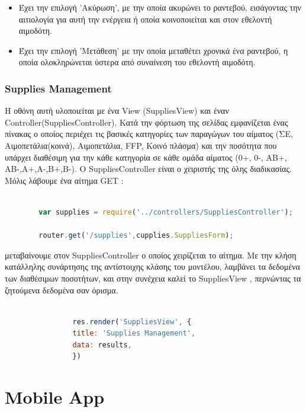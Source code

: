 		\begin{itemize}
		\item Έχει την επιλογή 'Ακύρωση', με την οποία ακυρώνει το ραντεβού, εισάγοντας την αιτιολογία για αυτή την ενέργεια ή οποία κοινοποιείται και στον εθελοντή αιμοδότη.
		
		\item Έχει την επιλογή 'Μετάθεση' με την οποία μεταθέτει χρονικά ένα ραντεβού, η οποία ολοκληρώνεται ύστερα από συναίνεση του εθελοντή αιμοδότη.		
		\end{itemize}

		

		\subsubsection{Supplies Management}
		
	Η οθόνη αυτή υλοποιείται με ένα View (SuppliesView) και έναν Controller(SuppliesController). Κατά την φόρτωση της σελίδας εμφανίζεται ένας πίνακας ο οποίος περιέχει τις βασικές κατηγορίες των παραγώγων του αίματος (ΣΕ, Αιμοπετάλια(κοινά), Αιμοπετάλια, FFP, Κοινό πλάσμα) και την ποσότητα που υπάρχει διαθέσιμη για την κάθε κατηγορία σε κάθε ομάδα αίματος (0+, 0-, ΑΒ+, ΑΒ-,Α+,Α-,Β+,Β-). O SuppliesController είναι ο χειριστής της όλης διαδικασίας. Μόλις λάβουμε ένα αίτημα GET :
		
		\begin{lstlisting}[language=Javascript]			
		
		var supplies = require('../controllers/SuppliesController');
		
		router.get('/supplies',cupplies.SuppliesForm);  


		\end{lstlisting}
		
μεταβαίνουμε στον SuppliesController ο οποίος χειρίζεται το αίτημα. Με την κλήση κατάλληλης συνάρτησης της αντίστοιχης κλάσης του μοντέλου, λαμβάνει τα δεδομένα των διαθέσιμων ποσοτήτων,  και στην συνέχεια καλεί το SuppliesView , περνώντας τα ζητούμενα δεδομένα σαν όρισμα.



		\begin{lstlisting}[language=Javascript]			
		
	            res.render('SuppliesView', { 
                title: 'Supplies Management',
                data: results,
				})

		\end{lstlisting}
	

\section{Mobile App}
	
